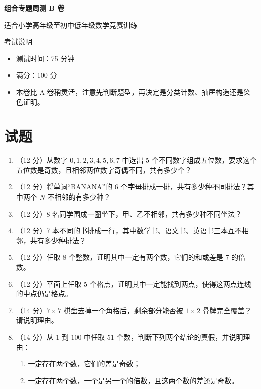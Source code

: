 \documentclass[11pt,a4paper,fontset=fandol]{ctexart}
\newcommand{\answerspace}{\vspace{2.4cm}}
\newcommand{\biganswerspace}{\vspace{3.2cm}}
\begin{document}
\thispagestyle{empty}
\begin{center}
{\fontsize{22}{28}\selectfont\bfseries 组合专题周测 B 卷\par}
\vspace{0.4cm}
{\large 适合小学高年级至初中低年级数学竞赛训练\par}
\end{center}

\begin{infobox}{考试说明}
\begin{itemize}
  \item 测试时间：75 分钟
  \item 满分：100 分
  \item 本卷比 A 卷稍灵活，注意先判断题型，再决定是分类计数、抽屉构造还是染色证明。
\end{itemize}
\end{infobox}

\section{试题}

\begin{enumerate}
  \item （12 分）从数字 $0,1,2,3,4,5,6,7$ 中选出 5 个不同数字组成五位数，要求这个五位数是奇数，且相邻两位数字奇偶不同，共有多少个？
  \biganswerspace

  \item （12 分）将单词“BANANA”的 6 个字母排成一排，共有多少种不同排法？其中两个 $N$ 不相邻的有多少种？
  \answerspace

  \item （12 分）8 名同学围成一圈坐下，甲、乙不相邻，共有多少种不同坐法？
  \answerspace

  \item （12 分）7 本不同的书排成一行，其中数学书、语文书、英语书三本互不相邻，共有多少种排法？
  \biganswerspace

  \item （12 分）任取 8 个整数，证明其中一定有两个数，它们的和或差是 7 的倍数。
  \answerspace

  \item （12 分）平面上任取 5 个格点，证明其中一定能找到两点，使得这两点连线的中点仍是格点。
  \answerspace

  \item （14 分）$7\times 7$ 棋盘去掉一个角格后，剩余部分能否被 $1\times 2$ 骨牌完全覆盖？请说明理由。
  \biganswerspace

  \item （14 分）从 $1$ 到 $100$ 中任取 51 个数，判断下列两个结论的真假，并说明理由：
  \begin{enumerate}
    \item 一定存在两个数，它们的差是奇数；
    \item 一定存在两个数，一个是另一个的倍数，且这两个数的差还是奇数。
  \end{enumerate}
  \biganswerspace
\end{enumerate}
\end{document}
